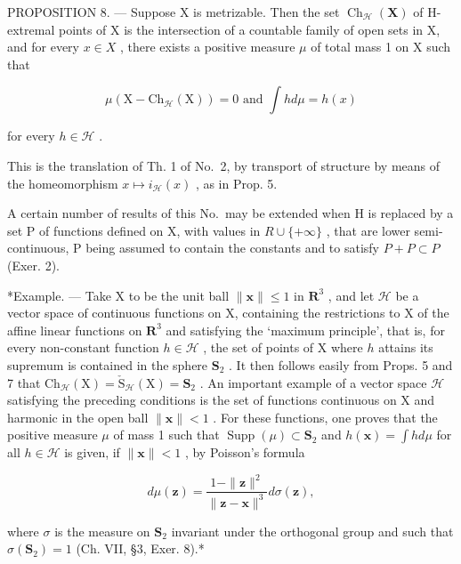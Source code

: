 PROPOSITION 8. --- Suppose X is metrizable. Then the set \(\operatorname{Ch}_{\mathcal{H}}(\mathbf{X})\) of H-extremal points of X is the intersection of a countable family of open sets in X, and for every \(x \in X\) , there exists a positive measure \(\mu\) of total mass 1 on X such that

\[
\mu (\mathrm{X} - \mathrm{Ch} _ {\mathcal {H}} (\mathrm{X})) = 0 \text { and } \int h d \mu = h (x)
\]

for every \(h \in \mathcal{H}\) .

This is the translation of Th. 1 of No.~2, by transport of structure by means of the homeomorphism \(x \mapsto i_{\mathcal{H}}(x)\) , as in Prop. 5.

A certain number of results of this No.~may be extended when H is replaced by a set P of functions defined on X, with values in \(R \cup \{+\infty\}\) , that are lower semi-continuous, P being assumed to contain the constants and to satisfy \(P + P \subset P\) (Exer. 2).

*Example. --- Take X to be the unit ball \(\| \mathbf{x} \| \leqslant 1\) in \(\mathbf{R}^3\) , and let \(\mathcal{H}\) be a vector space of continuous functions on X, containing the restrictions to X of the affine linear functions on \(\mathbf{R}^3\) and satisfying the `maximum principle', that is, for every non-constant function \(h \in \mathcal{H}\) , the set of points of X where \(h\) attains its supremum is contained in the sphere \(\mathbf{S}_2\) . It then follows easily from Props. 5 and 7 that \(\mathrm{Ch}_{\mathcal{H}}(\mathrm{X}) = \check{\mathrm{S}}_{\mathcal{H}}(\mathrm{X}) = \mathbf{S}_2\) . An important example of a vector space \(\mathcal{H}\) satisfying the preceding conditions is the set of functions continuous on X and harmonic in the open ball \(\| \mathbf{x} \| < 1\) . For these functions, one proves that the positive measure \(\mu\) of mass 1 such that \(\operatorname{Supp}(\mu) \subset \mathbf{S}_2\) and \(h(\mathbf{x}) = \int h d\mu\) for all \(h \in \mathcal{H}\) is given, if \(\| \mathbf{x} \| < 1\) , by Poisson's formula

\[
d \mu (\mathbf {z}) = \frac {1 - \| \mathbf {z} \| ^ {2}}{\| \mathbf {z} - \mathbf {x} \| ^ {3}} d \sigma (\mathbf {z}),
\]

where \(\sigma\) is the measure on \(\mathbf{S}_2\) invariant under the orthogonal group and such that \(\sigma(\mathbf{S}_2) = 1\) (Ch. VII, §3, Exer. 8).*

